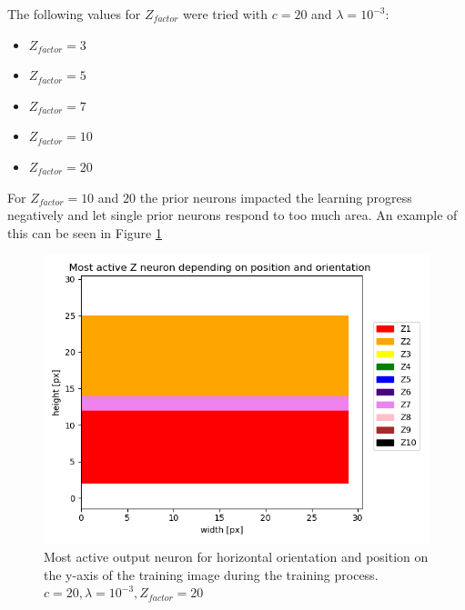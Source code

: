 The following values for $Z_{factor} $ were tried with $c = 20$ and $\lambda = 10^{-3}$:
\begin{itemize}
  \item $Z_{factor} = 3$
  \item $Z_{factor} = 5$
  \item $Z_{factor} = 7$  
  \item $Z_{factor} = 10$ 
  \item $Z_{factor} = 20$
\end{itemize}

For $Z_{factor} = 10$ and $20$ the prior neurons impacted the learning progress negatively and let single prior neurons respond to too much area. An example of this can be seen in Figure \ref{fig:horvert_c20_3_Zfactor20_horizontalLines}

\begin{figure}
  \includegraphics[width=\linewidth]{figures/horvert/horvert_c20_3_Zfactor20_horizontalLines.png}
  \caption{Most active output neuron for horizontal orientation and position on the y-axis of the training image during the training process. $c = 20, \lambda = 10^{-3}, Z_{factor} = 20$}
  \label{fig:horvert_c20_3_Zfactor20_horizontalLines}
\end{figure}


